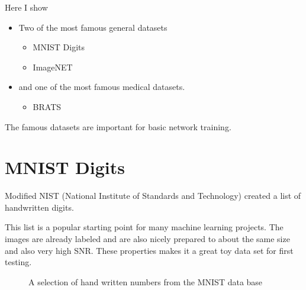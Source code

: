 \documentclass[letterpaper,10pt,english]{sphinxmanual}
\begin{document}
\sphinxAtStartPar
Here I show
\begin{itemize}
\item {} 
\sphinxAtStartPar
Two of the most famous general datasets
\begin{itemize}
\item {} 
\sphinxAtStartPar
MNIST Digits

\item {} 
\sphinxAtStartPar
ImageNET

\end{itemize}

\item {} 
\sphinxAtStartPar
and one of the most famous medical datasets.
\begin{itemize}
\item {} 
\sphinxAtStartPar
BRATS

\end{itemize}

\end{itemize}

\sphinxAtStartPar
The famous datasets are important for basic network training.


\section{MNIST Digits}
\label{\detokenize{03-Datasets:mnist-digits}}
\sphinxAtStartPar
Modified NIST (National Institute of Standards and Technology) created a list of handwritten digits.

\sphinxAtStartPar
This list is a popular starting point for many machine learning projects. The images are already labeled and are also nicely prepared to about the same size and also very high SNR. These properties makes it a great toy data set for first testing.

\begin{figure}[htbp]
\centering
\capstart

\noindent{}
\caption{A selection of hand written numbers from the MNIST data base}\label{\detokenize{03-Datasets:id6}}\end{figure}
\end{document}
